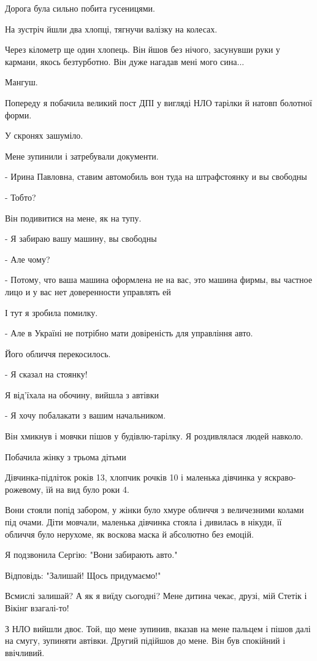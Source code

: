 Дорога була сильно побита гусеницями.

На зустріч йшли два хлопці, тягнучи валізку на колесах.  

Через кілометр ще один хлопець. Він йшов без нічого, засунувши руки у кармани,
якось безтурботно. Він дуже нагадав мені мого сина...

Мангуш.

Попереду я побачила великий пост ДПІ у вигляді НЛО тарілки й натовп болотної
форми. 

У скронях зашуміло.

Мене зупинили і затребували документи. 

- Ирина Павловна,  ставим автомобиль вон туда на штрафстоянку и вы свободны

- Тобто?

Він подивитися на мене, як на тупу. 

- Я забираю вашу машину, вы свободны

- Але чому?

- Потому, что ваша машина оформлена не на вас, это машина фирмы, вы частное
лицо и у вас нет доверенности управлять ей 

І тут я зробила помилку.

- Але в Україні не потрібно мати довіреність для управління авто.

Його обличчя перекосилось. 

- Я сказал на стоянку!

Я від'їхала на обочину,  вийшла з автівки

- Я хочу побалакати з вашим начальником.

Він хмикнув і мовчки пішов у будівлю-тарілку. Я роздивлялася людей навколо.

Побачила жінку з трьома дітьми

Дівчинка-підліток років 13, хлопчик рочків 10 і маленька дівчинка у
яскраво-рожевому, їй на вид було роки 4. 

Вони стояли попід забором, у жінки було хмуре обличчя з величезними колами під
очами. Діти мовчали, маленька дівчинка стояла і дивилась в нікуди, її обличчя
було нерухоме, як воскова маска й абсолютно без емоцій. 

Я подзвонила Сергію: "Вони забирають авто." 

Відповідь: "Залишай! Щось придумаємо!"

Всмислі залишай? А як я виїду сьогодні? Мене дитина чекає, друзі, мій Стетік і
Вікінг взагалі-то!

З НЛО вийшли двоє. Той, що мене зупинив, вказав на мене пальцем і пішов далі на
смугу, зупиняти автівки. Другий підійшов до мене. Він був спокійний і
ввічливий.

